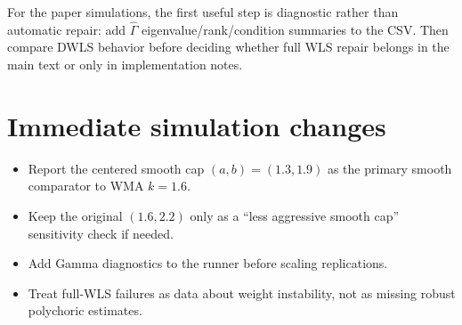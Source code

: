 \documentclass[11pt]{article}
\newcommand{\Ghat}{\widehat\Gamma}
\begin{document}
For the paper simulations, the first useful step is diagnostic rather than
automatic repair: add $\Ghat$ eigenvalue/rank/condition summaries to the CSV.
Then compare DWLS behavior before deciding whether full WLS repair belongs in
the main text or only in implementation notes.

\section*{Immediate simulation changes}

\begin{itemize}
\item Report the centered smooth cap $(a,b)=(1.3,1.9)$ as the primary smooth
  comparator to WMA $k=1.6$.
\item Keep the original $(1.6,2.2)$ only as a ``less aggressive smooth cap''
  sensitivity check if needed.
\item Add Gamma diagnostics to the runner before scaling replications.
\item Treat full-WLS failures as data about weight instability, not as missing
  robust polychoric estimates.
\end{itemize}
\end{document}

